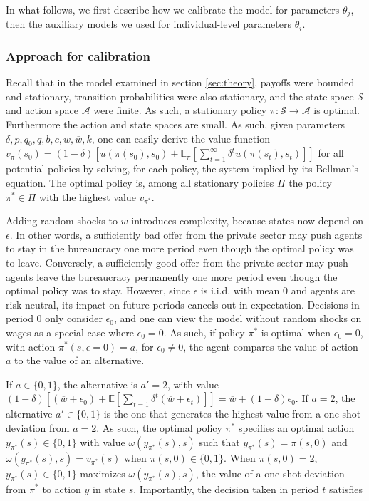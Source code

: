 \documentclass[12pt,a4paper]{article}
\theoremstyle{definition}
\newcommand{\wb}{\overline{w}}
\newcommand{\de}{\delta}
\newcommand{\St}{\mathcal{S}}
\newcommand{\A}{\mathcal{A}}
\begin{document}
{In what follows, we first describe how we calibrate the model for parameters $\theta_j$, then the auxiliary models we used for individual-level parameters $\theta_i$. 

\subsubsection{Approach for calibration}

Recall that in the model examined in section \ref{sec:theory}, payoffs were bounded and stationary, transition probabilities were also stationary, and the state space $\St$ and action space $\A$ were finite. As such, a stationary policy $\pi : \St \rightarrow \A$ is optimal. Furthermore the action and state spaces are small. As such, given parameters $\de, p, q_0, q, b, c, w, \wb, k$, one can easily derive the value function $v_\pi(s_0) = (1-\de) \left[ u(\pi(s_0), s_0) + \mathbb{E}_\pi \left[ \sum_{t=1}^\infty \de^t u(\pi(s_t), s_t) \right] \right]$ for all potential policies by solving, for each policy, the system implied by its Bellman's equation. The optimal policy is, among all stationary policies $\Pi$ the policy $\pi^* \in \Pi$ with the highest value $v_{\pi^*}$. 

Adding random shocks to $\wb$ introduces complexity, because states now depend on $\epsilon$. In other words, a sufficiently bad offer from the private sector may push agents to stay in the bureaucracy one more period even though the optimal policy was to leave. Conversely, a sufficiently good offer from the private sector may push agents leave the bureaucracy permanently one more period even though the optimal policy was to stay. However, since $\epsilon$ is i.i.d. with mean 0 and agents are risk-neutral, its impact on future periods cancels out in expectation. Decisions in period 0 only consider $\epsilon_0$, and one can view the model without random shocks on wages as a special case where $\epsilon_0 = 0$. As such, if policy $\pi^*$ is optimal when $\epsilon_0 = 0$, with action $\pi^*(s,\epsilon=0)=a$, for $\epsilon_0 \neq 0$, the agent compares the value of action $a$ to the value of an alternative. 

If $a \in \{0,1\}$, the alternative is $a' = 2$, with value $(1-\de) \left[ (\wb + \epsilon_0) + \mathbb{E} \left[ \sum_{t=1} \de^t (\wb + \epsilon_t)\right] \right] = \wb + (1-\de) \epsilon_0$. If $a = 2$, the alternative $a' \in \{0,1\}$ is the one that generates the highest value from a one-shot deviation from $a = 2$. As such, the optimal policy $\pi^*$ specifies an optimal action $y_{\pi^*}(s) \in \{0,1\}$ with value $\omega(y_{\pi^*}(s),s)$ such that $y_{\pi^*}(s) = \pi(s, 0)$ and $\omega(y_{\pi^*}(s),s) = v_{\pi^*}(s)$ when $\pi(s,0) \in \{0,1\}$. When $\pi(s,0) = 2$, $y_{\pi^*}(s) \in \{0,1\}$ maximizes $\omega(y_{\pi^*}(s),s)$, the value of a one-shot deviation from $\pi^*$ to action $y$ in state $s$. Importantly, the decision taken in period $t$ satisfies

}
\end{document}
